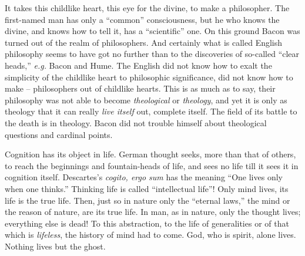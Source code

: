 \noindent{}It takes this childlike heart, this eye for the divine, to make a 
philosopher. The first-named man has only a ``common'' consciousness, but he 
who knows the divine, and knows how to tell it, has a ``scientific'' one. On 
this ground Bacon was turned out of the realm of philosophers. And certainly 
what is called English philosophy seems to have got no further than to the 
discoveries of so-called ``clear heads,'' \textit{e.g.} Bacon and Hume. The 
English did not know how to exalt the simplicity of the childlike heart to 
philosophic significance, did not know how to make -- philosophers out of 
childlike hearts. This is as much as to say, their philosophy was not able to 
become \textit{theological} or \textit{theology}, and yet it is only as 
theology that it can really \textit{live itself} out, complete itself. The 
field of its battle to the death is in theology. Bacon did not trouble himself 
about theological questions and cardinal points.

Cognition has its object in life. German thought seeks, more than that of 
others, to reach the beginnings and fountain-heads of life, and sees no life 
till it sees it in cognition itself. Descartes's \textit{cogito, ergo sum} has 
the meaning ``One lives only when one thinks.'' Thinking life is called 
``intellectual life''! Only mind lives, its life is the true life. Then, 
just so in nature only the ``eternal laws,'' the mind or the reason of 
nature, are its true life. In man, as in nature, only the thought lives; 
everything else is dead! To this abstraction, to the life of generalities or 
of that which is \textit{lifeless}, the history of mind had to come. God, who 
is spirit, alone lives. Nothing lives but the ghost.

